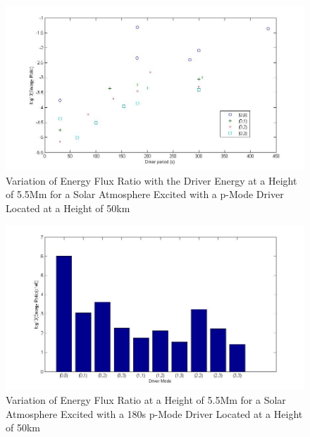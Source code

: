 \documentclass[final,1p]{elsarticle}
\begin{document}
\clearpage

\begin{figure}[t]
\includegraphics[scale=0.4]{imagesn/ratio_varoverdrve_eflux_vperiod_for modes_5p5Mm.jpg}
\caption{Variation of Energy Flux Ratio with the Driver Energy at a Height of 5.5Mm for a Solar Atmosphere Excited with a p-Mode Driver Located at a Height of 50km}
\end{figure}


\clearpage

\begin{figure}[h]
\includegraphics[scale=0.5]{imagesn/ratio_varoverdrve_eflux_vperiod_forallmodes_180s_5p5Mm.jpg}
\caption{Variation of Energy Flux Ratio at a Height of 5.5Mm for a Solar Atmosphere Excited with a 180s p-Mode Driver Located at a Height of 50km}
\end{figure}
\end{document}
